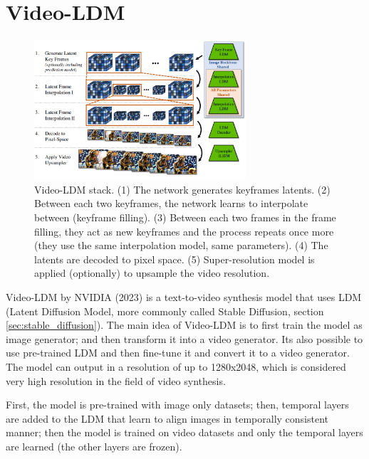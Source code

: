 \section{Video-LDM}
\label{sec:videoldm}

\begin{figure}
    \centering
    \includegraphics[width=0.7\textwidth]{images/video_ldm/stack.png}
    \caption{Video-LDM stack. (1) The network generates keyframes latents. (2) Between each two keyframes, the network learns to interpolate between (keyframe filling). (3) Between each two frames in the frame filling, they act as new keyframes and the process repeats once more (they use the same interpolation model, same parameters). (4) The latents are decoded to pixel space. (5) Super-resolution model is applied (optionally) to upsample the video resolution.}
\end{figure}

Video-LDM by NVIDIA (2023) \cite{video_ldm} is a text-to-video synthesis model that uses LDM (Latent Diffusion Model, more commonly called Stable Diffusion, section \ref{sec:stable_diffusion}). The main idea of Video-LDM is to first train the model as image generator; and then transform it into a video generator. Its also possible to use pre-trained LDM and then fine-tune it and convert it to a video generator. The model can output in a resolution of up to 1280x2048, which is considered very high resolution in the field of video synthesis.

First, the model is pre-trained with image only datasets; then, temporal layers are added to the LDM that learn to align images in temporally consistent manner; then the model is trained on video datasets and only the temporal layers are learned (the other layers are frozen).

